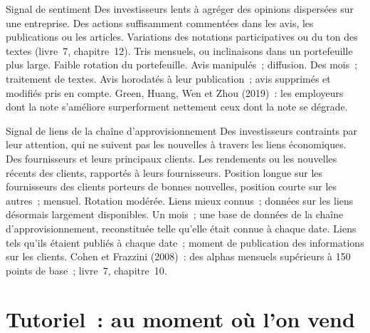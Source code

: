 \begin{strategyfile}{Signal de sentiment}\label{strat:s1:alternative-data-strategies:sentiment}
 Des investisseurs lents à agréger des opinions dispersées sur une entreprise.
 Des actions suffisamment commentées dans les avis, les publications ou les articles.
 Variations des notations participatives ou du ton des textes (livre~7, chapitre~12).
 Tris mensuels, ou inclinaisons dans un portefeuille plus large.
 Faible rotation du portefeuille.
 Avis manipulés~; diffusion.
 Des mois~; traitement de textes.
 Avis horodatés à leur publication~; avis supprimés et modifiés pris en compte.
 Green, Huang, Wen et Zhou (2019)~: les employeurs dont la note s'améliore surperforment nettement ceux dont la note se dégrade.
\end{strategyfile}

\begin{strategyfile}{Signal de liens de la chaîne d'approvisionnement}\label{strat:s1:alternative-data-strategies:supply}
 Des investisseurs contraints par leur attention, qui ne suivent pas les nouvelles à travers les liens économiques.
 Des fournisseurs et leurs principaux clients.
 Les rendements ou les nouvelles récents des clients, rapportés à leurs fournisseurs.
 Position longue sur les fournisseurs des clients porteurs de bonnes nouvelles, position courte sur les autres~; mensuel.
 Rotation modérée.
 Liens mieux connus~; données sur les liens désormais largement disponibles.
 Un mois~; une base de données de la chaîne d'approvisionnement, reconstituée telle qu'elle était connue à chaque date.
 Liens tels qu'ils étaient publiés à chaque date~; moment de publication des informations sur les clients.
 Cohen et Frazzini (2008)~: des alphas mensuels supérieurs à 150 points de base~; livre~7, chapitre~10.
\end{strategyfile}

\section{Tutoriel~: au moment où l'on vend}\label{tut:s1:alternative-data-strategies:tut}

